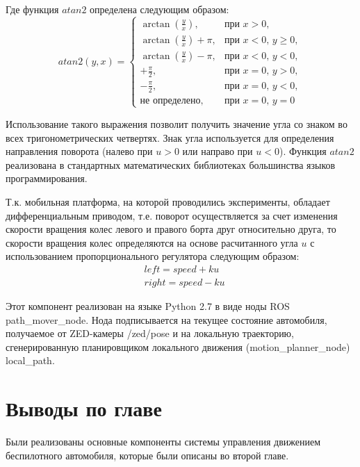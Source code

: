 Где функция $atan2$ определена следующим образом:
\begin{equation}
    atan2(y,x) =
        \begin{cases}
            \arctan(\frac{y}{x}),       & \text{при $x > 0$}, \\
            \arctan(\frac{y}{x}) + \pi, & \text{при $x < 0$, $y \geq 0$}, \\
            \arctan(\frac{y}{x}) - \pi, & \text{при $x < 0$, $y < 0$}, \\
            +\frac{\pi}{2},             & \text{при $x = 0$, $y > 0$}, \\
            -\frac{\pi}{2},             & \text{при $x = 0$, $y < 0$}, \\
            \text{не определено},       & \text{при $x = 0$, $y = 0$}
        \end{cases}
\end{equation}

Использование такого выражения позволит получить значение угла со знаком во всех тригонометрических четвертях.
Знак угла используется для определения направления поворота (налево при $u > 0$ или направо при $u < 0$). Функция $atan2$ реализована в
стандартных математических библиотеках большинства языков программирования.

Т.к. мобильная платформа, на которой проводились эксперименты, обладает дифференциальным приводом, т.е. поворот
осуществляется за счет изменения скорости вращения колес левого и правого борта друг относительно друга, то
скорости вращения колес определяются на основе расчитанного угла $u$ с использованием пропорционального регулятора
следующим образом:
\begin{align}
    &left = speed + ku \\
    &right = speed - ku
\end{align}

Этот компонент реализован на языке Python 2.7 в виде ноды ROS path\_mover\_node. Нода подписывается на текущее состояние
автомобиля, получаемое от ZED-камеры /zed/pose и на локальную траекторию, сгенерированную планировщиком локального
движения (motion\_planner\_node) local\_path.

\section{Выводы по главе}

Были реализованы основные компоненты системы управления движением беспилотного автомобиля, которые были описаны
во второй главе.

